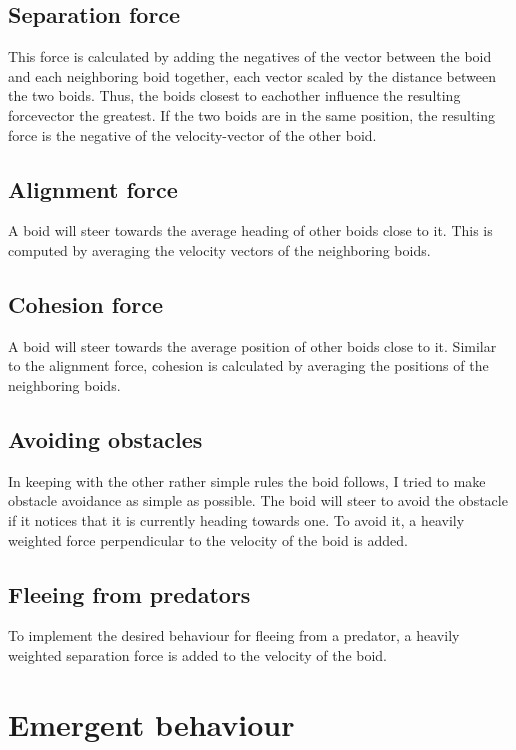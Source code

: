 \documentclass[twoside]{article}
\begin{document}
\begin{multicols}{2}
    \subsection{Separation force}

    This force is calculated by adding the negatives of the vector between the boid and each neighboring boid together, each vector scaled by the distance between the two boids. 
    Thus, the boids closest to eachother influence the resulting forcevector the greatest.
    If the two boids are in the same position, the resulting force is the negative of the velocity-vector of the other boid.

    \subsection{Alignment force}

    A boid will steer towards the average heading of other boids close to it.
    This is computed by averaging the velocity vectors of the neighboring boids.

    \subsection{Cohesion force}

    A boid will steer towards the average position of other boids close to it.
    Similar to the alignment force, cohesion is calculated by averaging the positions of the neighboring boids.

    \subsection{Avoiding obstacles}

    In keeping with the other rather simple rules the boid follows, I tried to make obstacle avoidance as simple as possible.
    The boid will steer to avoid the obstacle if it notices that it is currently heading towards one.
    To avoid it, a heavily weighted force perpendicular to the velocity of the boid is added.

    \subsection{Fleeing from predators}

    To implement the desired behaviour for fleeing from a predator, a heavily weighted separation force is added to the velocity of the boid.
    

    \section{Emergent behaviour}


\end{multicols}
\end{document}

